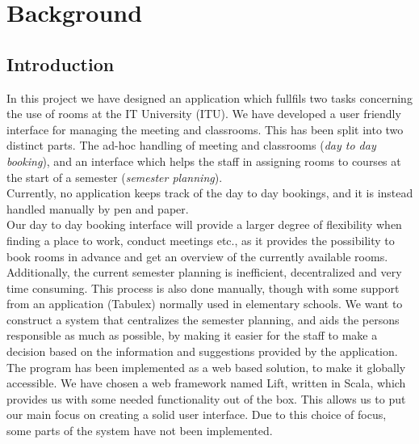 \chapter{Background}
\section{Introduction}
In this project we have designed an application which fullfils two tasks concerning the use of rooms at the IT University (ITU). We have developed a user friendly interface for managing the meeting and classrooms. This has been split into two distinct parts. The ad-hoc handling of meeting and classrooms (\emph{day to day booking}), and an interface which helps the staff in assigning rooms to courses at the start of a semester (\emph{semester planning}).\\

Currently, no application keeps track of the day to day bookings, and it is instead handled manually by pen and paper.\\
Our day to day booking interface will provide a larger degree of flexibility when finding a place to work, conduct meetings etc., as it provides the possibility to book rooms in advance and get an overview of the currently available rooms.\\

Additionally, the current semester planning is inefficient, decentralized and very time consuming. This process is also done manually, though with some support from an application (Tabulex\cite{tabulex}) normally used in elementary schools.
We want to construct a system that centralizes the semester planning, and aids the persons responsible as much as possible, by making it easier for the staff to make a decision based on the information and suggestions provided by the application. \\

The program has been implemented as a web based solution, to make it globally accessible. We have chosen a web framework named Lift, written in Scala, which provides us with some needed functionality out of the box. This allows us to put our main focus on creating a solid user interface. Due to this choice of focus, some parts of the system have not been implemented.



